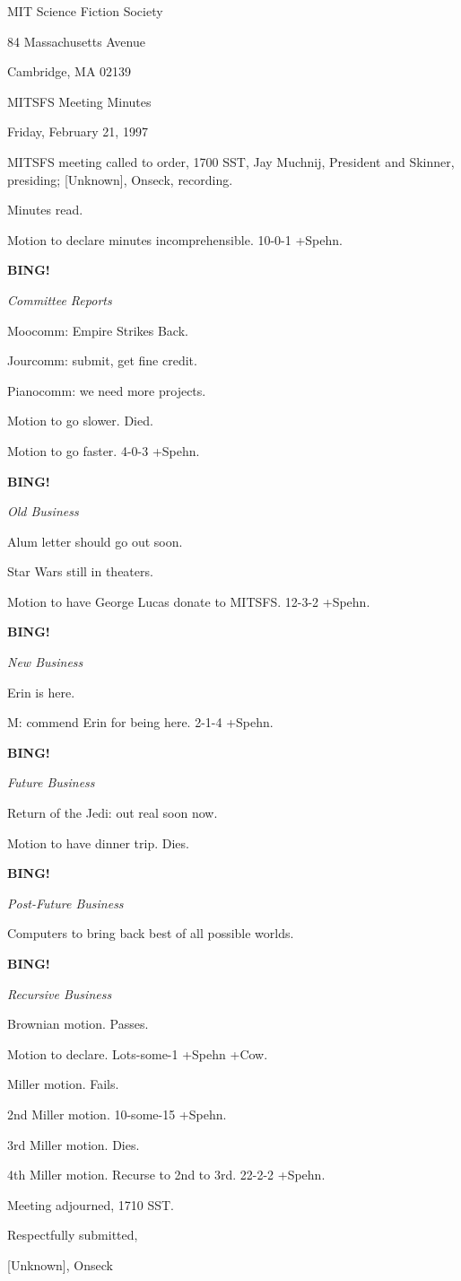 \documentclass[12pt]{article}
\newcommand{\bing}{{\bf BING!} }
\newcommand{\goto}[1]{\bing \vskip 12pt \centerline{{\em{#1}}}}
\begin{document}
\begin{center}

MIT Science Fiction Society 

84 Massachusetts Avenue

Cambridge, MA 02139

\vspace{12pt}

MITSFS Meeting Minutes 

Friday, February 21, 1997

\end{center}
 
\vspace{18pt}

\setlength{\parskip}{6pt}

\noindent
MITSFS meeting called to order, 1700 SST,
Jay Muchnij, President and Skinner, presiding; [Unknown], Onseck, recording.

Minutes read.

Motion to declare minutes incomprehensible. 10-0-1 +Spehn.

\goto{Committee Reports}

Moocomm: Empire Strikes Back.

Jourcomm: submit, get fine credit.

Pianocomm: we need more projects.

Motion to go slower. Died.

Motion to go faster. 4-0-3 +Spehn.

\goto{Old Business}

Alum letter should go out soon.

Star Wars still in theaters.

Motion to have George Lucas donate to MITSFS. 12-3-2 +Spehn.

\goto{New Business}

Erin is here.

M: commend Erin for being here. 2-1-4 +Spehn.

\goto{Future Business}

Return of the Jedi: out real soon now.

Motion to have dinner trip. Dies.

\goto{Post-Future Business}

Computers to bring back best of all possible worlds.

\goto{Recursive Business}

Brownian motion. Passes.

Motion to declare. Lots-some-1 +Spehn +Cow.

Miller motion. Fails.

2nd Miller motion. 10-some-15 +Spehn.

3rd Miller motion. Dies.

4th Miller motion. Recurse to 2nd to 3rd. 22-2-2 +Spehn.

\vspace{12pt}

\noindent
Meeting adjourned, 1710 SST.

\vspace{18pt}

\centerline{Respectfully submitted,}
\centerline{[Unknown], Onseck}
\end{document}
